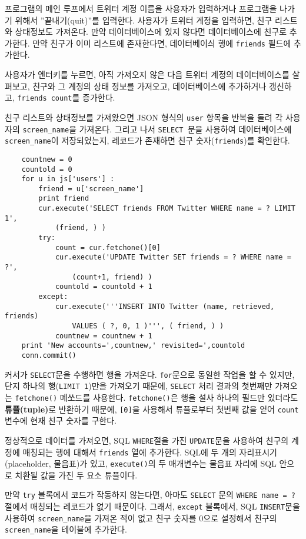 프로그램의 메인 루프에서 트위터 계정 이름을 사용자가 입력하거나 프로그램을 나가기 위해서 ''끝내기(quit)''를 
입력한다. 사용자가 트위터 계정을 입력하면, 친구 리스트와 상태정보도 가져온다. 
만약 데이터베이스에 있지 않다면 데이터베이스에 친구로 추가한다.
만약 친구가 이미 리스트에 존재한다면, 데이터베이싀 행에 {\tt friends} 필드에 추가한다.

사용자가 엔터키를 누르면, 아직 가져오지 않은 다음 트위터 계정의 데이터베이스를 살펴보고,
친구와 그 계정의 상태 정보를 가져오고, 데이터베이스에 추가하거나 갱신하고, {\tt friends count}를 증가한다.

친구 리스트와 상태정보를 가져왔으면 JSON 형식의 {\tt user} 항목을 반복을 돌려 각 사용자의 
\verb"screen_name"을 가져온다. 그리고 나서 {\tt SELECT }문을 사용하여 데이터베이스에 
\verb"screen_name"이 저장되었는지, 레코드가 존재하면 친구 숫자({\tt friends})를 확인한다.

\beforeverb
\begin{verbatim}
    countnew = 0
    countold = 0
    for u in js['users'] :
        friend = u['screen_name']
        print friend
        cur.execute('SELECT friends FROM Twitter WHERE name = ? LIMIT 1', 
            (friend, ) )
        try:
            count = cur.fetchone()[0]
            cur.execute('UPDATE Twitter SET friends = ? WHERE name = ?', 
                (count+1, friend) )
            countold = countold + 1
        except:
            cur.execute('''INSERT INTO Twitter (name, retrieved, friends) 
                VALUES ( ?, 0, 1 )''', ( friend, ) )
            countnew = countnew + 1
    print 'New accounts=',countnew,' revisited=',countold
    conn.commit()
\end{verbatim}
\afterverb
%

커서가 {\tt SELECT}문을 수행하면 행을 가져온다. 
{\tt for}문으로 동일한 작업을 할 수 있지만, 단지 하나의 행({\tt LIMIT 1})만을 가져오기 때문에,
{\tt SELECT} 처리 결과의 첫번째만 가져오는 {\tt fetchone()} 메쏘드를 사용한다.
{\tt fetchone()}은 행을 설사 하나의 필드만 있더라도 {\bf 튜플(tuple)}로 반환하기 때문에,
 {\tt [0]}을 사용해서 튜플로부터 첫번째 값을 얻어 {\tt count} 변수에 현재 친구 숫자를 구한다.

정상적으로 데이터를 가져오면, SQL {\tt WHERE}절을 가진 {\tt UPDATE}문을 사용하여
친구의 계정에 매칭되는 행에 대해서 {\tt friends} 열에 추가한다.
SQL에 두 개의 자리표시기(placeholder, 물음표)가 있고, {\tt execute()}의 두 매개변수는 
물음표 자리에 SQL 안으로 치환될 값을 가진 두 요소 튜플이다.

만약 {\tt try} 블록에서 코드가 작동하지 않는다면, 아마도 {\tt SELECT} 문의
{\tt WHERE name = ?} 절에서 매칭되는 레코드가 없기 때문이다.
그래서, {\tt except} 블록에서, SQL {\tt INSERT}문을 사용하여 
\verb"screen_name"을 가져온 적이 없고 친구 숫자를 0으로 설정해서 
친구의 \verb"screen_name"을 테이블에 추가한다. 

